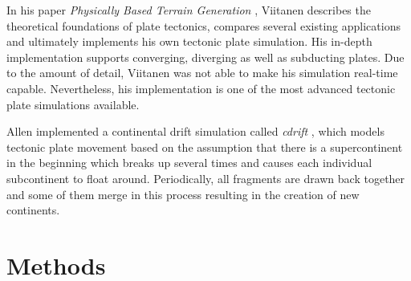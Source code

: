 \documentclass[11pt,a4paper,twoside,openright]{report}
\begin{document}
In his paper \emph{Physically Based Terrain Generation} \cite{Viitanen:2012}, Viitanen describes the theoretical foundations of plate tectonics, compares several existing applications and ultimately implements his own tectonic plate simulation. His in-depth implementation supports converging, diverging as well as subducting plates. Due to the amount of detail, Viitanen was not able to make his simulation real-time capable. Nevertheless, his implementation is one of the most advanced tectonic plate simulations available.

Allen implemented a continental drift simulation called \emph{cdrift} \cite{Allen:1991}, which models tectonic plate movement based on the assumption that there is a supercontinent in the beginning which breaks up several times and causes each individual subcontinent to float around. Periodically, all fragments are drawn back together and some of them merge in this process resulting in the creation of new continents.
\chapter{Methods}
\label{sec:methods}
\end{document}

